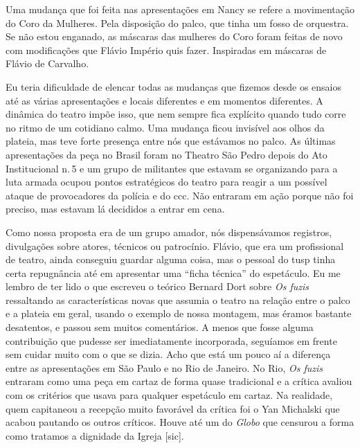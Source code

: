Uma mudança que foi feita nas apresentações em Nancy se refere a
movimentação do Coro da Mulheres. Pela disposição do palco, que tinha um
fosso de orquestra. Se não estou enganado, as máscaras das mulheres do
Coro foram feitas de novo com modificações que Flávio Império quis
fazer. Inspiradas em máscaras de Flávio de Carvalho.

Eu teria dificuldade de elencar todas as mudanças que fizemos desde os
ensaios até as várias apresentações e locais diferentes e em momentos
diferentes. A dinâmica do teatro impõe isso, que nem sempre fica
explícito quando tudo corre no ritmo de um cotidiano calmo. Uma mudança
ficou invisível aos olhos da plateia, mas teve forte presença entre nós
que estávamos no palco. As últimas apresentações da peça no Brasil foram
no Theatro São Pedro depois do Ato Institucional n.\,5 e um grupo de
militantes que estavam se organizando para a luta armada ocupou pontos
estratégicos do teatro para reagir a um possível ataque de provocadores
da polícia e do {\sc ccc}. Não entraram em ação porque não foi preciso, mas
estavam lá decididos a entrar em cena.

Como nossa proposta era de um grupo amador, nós dispensávamos registros,
divulgações sobre atores, técnicos ou patrocínio. Flávio, que era um
profissional de teatro, ainda conseguiu guardar alguma coisa, mas o
pessoal do {\sc tusp} tinha certa repugnância até em apresentar uma “ficha
técnica” do espetáculo. Eu me lembro de ter lido o que escreveu o
teórico Bernard Dort sobre {\it Os fuzis} ressaltando as características
novas que assumia o teatro na relação entre o palco e a plateia em
geral, usando o exemplo de nossa montagem, mas éramos bastante
desatentos, e passou sem muitos comentários. A menos que fosse alguma
contribuição que pudesse ser imediatamente incorporada, seguíamos em
frente sem cuidar muito com o que se dizia. Acho que está um pouco aí a
diferença entre as apresentações em São Paulo e no Rio de Janeiro. No
Rio, {\it Os fuzis} entraram como uma peça em cartaz de forma quase
tradicional e a crítica avaliou com os critérios que usava para qualquer
espetáculo em cartaz. Na realidade, quem capitaneou a recepção muito
favorável da crítica foi o Yan Michalski que acabou pautando os outros
críticos. Houve até um do {\it Globo} que censurou a forma como tratamos
a dignidade da Igreja {[}sic{]}.

